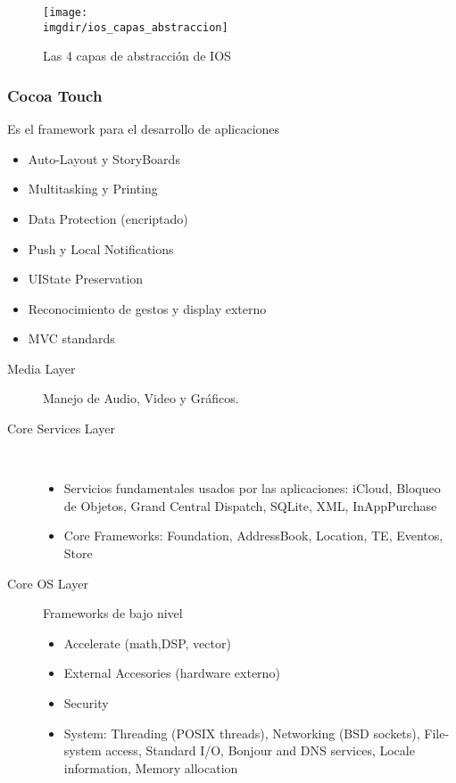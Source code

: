 \documentclass[a4paper, twoside]{article}
\newcommand{\imgdir}{../resources/images} %
\begin{document}
\begin{figure}[h]
	\centering
	\texttt{[image: \\imgdir/ios\_capas\_abstraccion]}
	\caption{Las 4 capas de abstracción de IOS}
	\label{fig:ios_capas_abstraccion}
\end{figure}

\subsubsection{Cocoa Touch}
Es el framework para el desarrollo de aplicaciones
\begin{itemize}
	\item Auto-Layout y StoryBoards
	\item Multitasking y Printing
	\item Data Protection (encriptado)
	\item Push y Local Notifications
	\item UIState Preservation
	\item Reconocimiento de gestos y display externo
	\item MVC standards
\end{itemize}

\begin{description}
	\item[Media Layer] Manejo de Audio, Video y Gráficos.

	\item[Core Services Layer] ~
	\begin{itemize}
		\item Servicios fundamentales usados por las aplicaciones: iCloud, Bloqueo de Objetos, Grand Central Dispatch, SQLite, XML, InAppPurchase
		\item Core Frameworks: Foundation, AddressBook, Location, TE, Eventos, Store
	\end{itemize}

	\item[Core OS Layer] Frameworks de bajo nivel
	\begin{itemize}
		\item Accelerate (math,DSP, vector)
		\item External Accesories (hardware externo)
		\item Security
		\item System: Threading (POSIX threads), Networking (BSD sockets), File-system access, Standard I/O, Bonjour and DNS services, Locale information, Memory allocation
	\end{itemize}
\end{description}
\end{document}
